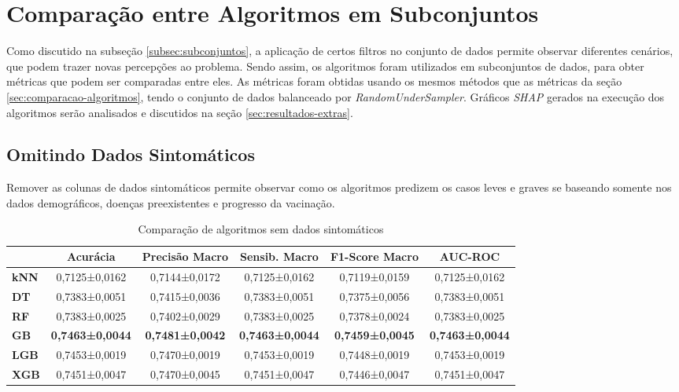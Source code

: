 \section{Comparação entre Algoritmos em Subconjuntos}
\label{sec:subconjuntos}

Como discutido na subseção \ref{subsec:subconjuntos}, a aplicação de certos filtros no conjunto de dados permite observar diferentes cenários, que podem trazer novas percepções ao problema. Sendo assim, os algoritmos foram utilizados em subconjuntos de dados, para obter métricas que podem ser comparadas entre eles. As métricas foram obtidas usando os mesmos métodos que as métricas da seção \ref{sec:comparacao-algoritmos}, tendo o conjunto de dados balanceado por \textit{RandomUnderSampler}. Gráficos \textit{SHAP} gerados na execução dos algoritmos serão analisados e discutidos na seção \ref{sec:resultados-extras}.

\subsection{Omitindo Dados Sintomáticos}
\label{subsec:subconjuntos-sem-sintomas}

Remover as colunas de dados sintomáticos permite observar como os algoritmos predizem os casos leves e graves se baseando somente nos dados demográficos, doenças preexistentes e progresso da vacinação.

\begin{table}[H]
  \footnotesize
  \centering
  \begin{tabular}{l|c|c|c|c|c|}
  \cline{2-6}
  \textbf{}                          & \textbf{Acurácia}      & \textbf{Precisão Macro} & \textbf{Sensib. Macro} & \textbf{F1-Score Macro} & \textbf{AUC-ROC}       \\ \hline
  \multicolumn{1}{|l|}{\textbf{kNN}} & 0,7125±0,0162          & 0,7144±0,0172           & 0,7125±0,0162          & 0,7119±0,0159           & 0,7125±0,0162          \\ \hline
  \multicolumn{1}{|l|}{\textbf{DT}}  & 0,7383±0,0051          & 0,7415±0,0036           & 0,7383±0,0051          & 0,7375±0,0056           & 0,7383±0,0051          \\ \hline
  \multicolumn{1}{|l|}{\textbf{RF}}  & 0,7383±0,0025          & 0,7402±0,0029           & 0,7383±0,0025          & 0,7378±0,0024           & 0,7383±0,0025          \\ \hline
  \multicolumn{1}{|l|}{\textbf{GB}}  & \textbf{0,7463±0,0044} & \textbf{0,7481±0,0042}  & \textbf{0,7463±0,0044} & \textbf{0,7459±0,0045}  & \textbf{0,7463±0,0044} \\ \hline
  \multicolumn{1}{|l|}{\textbf{LGB}} & 0,7453±0,0019          & 0,7470±0,0019           & 0,7453±0,0019          & 0,7448±0,0019           & 0,7453±0,0019          \\ \hline
  \multicolumn{1}{|l|}{\textbf{XGB}} & 0,7451±0,0047          & 0,7470±0,0045           & 0,7451±0,0047          & 0,7446±0,0047           & 0,7451±0,0047          \\ \hline
  \end{tabular}
\caption{Comparação de algoritmos sem dados sintomáticos}
\label{tab:comparacao-sem-dados-sintomaticos}
\end{table}

